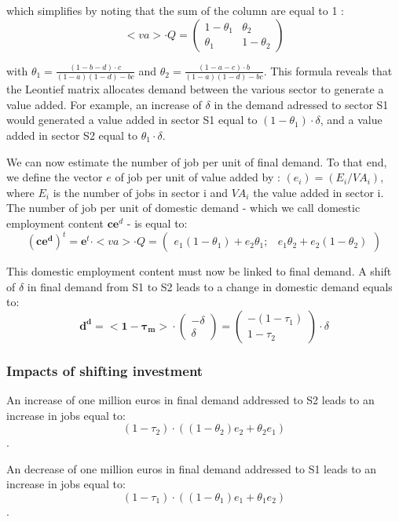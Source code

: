 which simplifies by noting that the sum of the column are equal to 1 :
$$<va> \cdot Q 
= 
\begin{pmatrix} 
1-\theta_1 & \theta_2 \\
\theta_1  & 1-\theta_2
\end{pmatrix}
$$

with $\theta_1 =  \frac{(1-b-d) \cdot c}{(1-a)(1-d)-bc}$ and $\theta_2 = \frac{(1-a-c) \cdot b}{(1-a)(1-d)-bc}$. 
This formula reveals that the Leontief matrix allocates demand between the various sector to generate a value added. For example, an increase of $\delta$ in the demand adressed to sector S1 would generated a value added in sector S1 equal to $(1-\theta_1) \cdot \delta$, and a value added in sector S2 equal to $\theta_1 \cdot \delta$.

We can now estimate the number of job per unit of final demand. To that end, we define the vector $e$ of job per unit of value added by :
$(e_i) = (E_i/VA_i)$, where $E_i$ is the number of jobs in sector i and $VA_i$ the value added in sector i.
The number of job per unit of domestic demand - which we call domestic employment content $\pmb{ce}^d$ - is equal to:
$$(\pmb{ce^d})^t =
\pmb{e}^t \cdot <va> \cdot Q 
= 
\begin{pmatrix} 
e_1 (1-\theta_1) + e_2 \theta_1 ;&
e_1 \theta_2  + e_2 (1-\theta_2)
\end{pmatrix}
$$

This domestic employment content must now be linked to final demand. 
A shift of $\delta$ in final demand from S1 to S2 leads to a change in domestic demand equals to:
$$\pmb{d^d} =
\pmb{<1-\tau_m>} \cdot 
\begin{pmatrix} 
-\delta  \\
\delta
\end{pmatrix} 
=
\begin{pmatrix} 
- (1 - \tau_1) \\
1 - \tau_2
\end{pmatrix} \cdot \delta
$$

\subsubsection{Impacts of shifting investment}
An increase of one million euros in final demand addressed to S2 leads to an increase in jobs equal to:
$$(1-\tau_2) \cdot \left( (1-\theta_2) e_2+ \theta_2 e_1 \right)$$.

An decrease of one million euros in final demand addressed to S1 leads to an increase in jobs equal to:
$$(1-\tau_1) \cdot \left( (1-\theta_1) e_1+ \theta_1 e_2 \right)$$.

